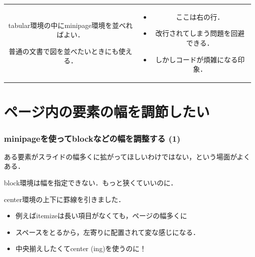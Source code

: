 \documentclass[unicode, 9pt, aspectratio=169]{beamer}
\begin{document}
\begin{frame}
\begin{center}
    \begin{tabular}{cc}
      \begin{minipage}{.5\linewidth}
        tabular環境の中にminipage環境を並べればよい．
        \begin{block}{}
          \centering
          普通の文書で図を並べたいときにも使える．
        \end{block}
      \end{minipage}
      &
      \begin{minipage}{.4\linewidth}
        \begin{itemize}
          \item ここは右の行．
          \item 改行されてしまう問題を回避できる．
          \item しかしコードが煩雑になる印象．
        \end{itemize}
      \end{minipage}
    \end{tabular}
  \end{center}
\end{frame}

\section{ページ内の要素の幅を調節したい}
\begin{frame}
  \frametitle{minipageを使ってblockなどの幅を調整する (1)}
  ある要素がスライドの幅多くに拡がってほしいわけではない，という場面がよくある．
  \begin{block}{}
    \centering
    block環境は幅を指定できない．もっと狭くていいのに．
  \end{block}

  \hrulefill{}
  \begin{center}
    center環境の上下に罫線を引きました．
    \begin{itemize}
      \item 例えばitemizeは長い項目がなくても，ページの幅多くに
      \item スペースをとるから，左寄りに配置されて変な感じになる．
      \item 中央揃えしたくてcenter (ing)を使うのに！
    \end{itemize}
  \end{center}
  \hrulefill{}
\end{frame}
\end{document}
